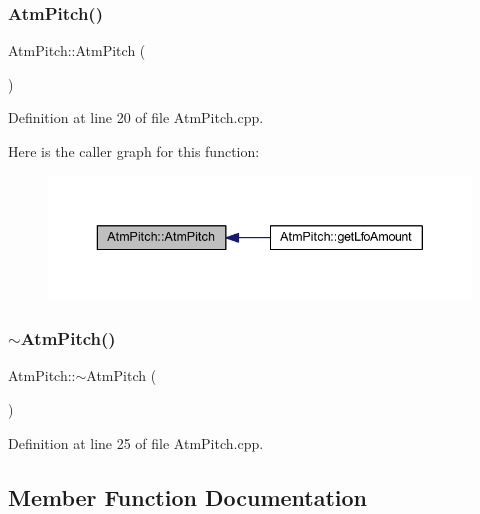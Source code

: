 \subsubsection{\texorpdfstring{Atm\+Pitch()}{AtmPitch()}}
{\footnotesize\ttfamily Atm\+Pitch\+::\+Atm\+Pitch (\begin{DoxyParamCaption}{ }\end{DoxyParamCaption})}



Definition at line 20 of file Atm\+Pitch.\+cpp.

Here is the caller graph for this function\+:
\nopagebreak
\begin{figure}[H]
\begin{center}
\leavevmode
\includegraphics[width=343pt]{class_atm_pitch_a02c102d3f93af7a44230dad9c23f4023_icgraph}
\end{center}
\end{figure}
\mbox{\label{class_atm_pitch_aaefa1f3952ff8c8c6b8cf0ed99cc1fa7}} 
\subsubsection{\texorpdfstring{$\sim$\+Atm\+Pitch()}{~AtmPitch()}}
{\footnotesize\ttfamily Atm\+Pitch\+::$\sim$\+Atm\+Pitch (\begin{DoxyParamCaption}{ }\end{DoxyParamCaption})}



Definition at line 25 of file Atm\+Pitch.\+cpp.



\subsection{Member Function Documentation}
\mbox{\label{class_atm_pitch_a850e1e507b70bc3a12049d48cd65283f}} 
